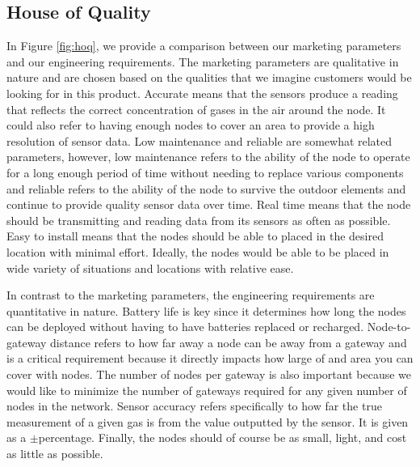 \subsection{House of Quality}
In Figure \ref{fig:hoq}, we provide a comparison between our marketing
parameters and our engineering requirements. The marketing parameters are
qualitative in nature and are chosen based on the qualities that we imagine
customers would be looking for in this product. Accurate means that the sensors
produce a reading that reflects the correct concentration of gases in the air
around the node. It could also refer to having enough nodes to cover an area to
provide a high resolution of sensor data. Low maintenance and reliable are
somewhat related parameters, however, low maintenance refers to the ability of
the node to operate for a long enough period of time without needing to replace
various components and reliable refers to the ability of the node to survive the
outdoor elements and continue to provide quality sensor data over time. Real
time means that the node should be transmitting and reading data from its
sensors as often as possible. Easy to install means that the nodes should be
able to placed in the desired location with minimal effort. Ideally, the nodes
would be able to be placed in wide variety of situations and locations with
relative ease.

In contrast to the marketing parameters, the engineering requirements are
quantitative in nature. Battery life is key since it determines how long the
nodes can be deployed without having to have batteries replaced or recharged.
Node-to-gateway distance refers to how far away a node can be away from a
gateway and is a critical requirement because it directly impacts how large of
and area you can cover with nodes. The number of nodes per gateway is also
important because we would like to minimize the number of gateways required for
any given number of nodes in the network. Sensor accuracy refers specifically to
how far the true measurement of a given gas is from the value outputted by the
sensor. It is given as a $\pm$percentage. Finally, the nodes should of course be
as small, light, and cost as little as possible.

